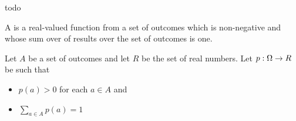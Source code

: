 
\sbasic















\sstart
{}


todo


A
is a real-valued function
from a set of outcomes which is
non-negative and whose sum over
of results over the set of outcomes
is one.



Let $A$ be a set of outcomes and
let $R$ be the set of real numbers.
Let $p: \Omega \to R$ be such that

\begin{itemize}

\item $p(a) > 0$ for each $a \in A$ and
\item $\sum_{a \in A} p(a) = 1$

\end{itemize}
\strats
